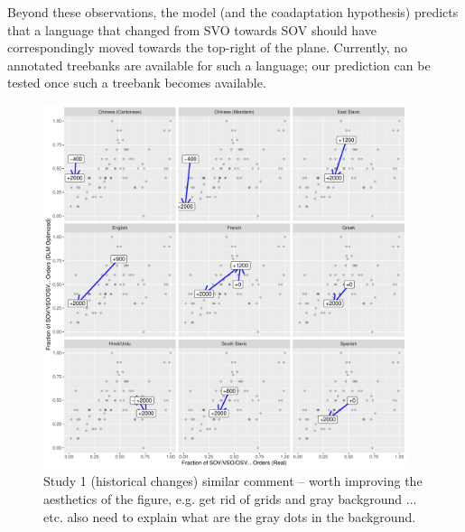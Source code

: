 \documentclass[11pt,a4paper]{article}
\newcommand\comment[1]{{\color{red}#1}}
\newcommand\mhahn[1]{{\color{red}(#1)}}
\begin{document}



Beyond these observations, the model (and the coadaptation hypothesis) predicts that a language that changed from SVO towards SOV should have correspondingly moved towards the top-right of the plane. 
Currently, no annotated treebanks are available for such a language; our prediction can be tested once such a treebank becomes available.



\begin{figure}
    \centering
    \includegraphics[width=0.95\textwidth]{figures/historical_2.6_times.pdf}
    \caption{Study 1 (historical changes) \comment{similar comment -- worth improving the aesthetics of the figure, e.g. get rid of grids and gray background ... etc. also need to explain what are the gray dots in the background.}}
    \label{fig:historical}
\end{figure}
\end{document}
